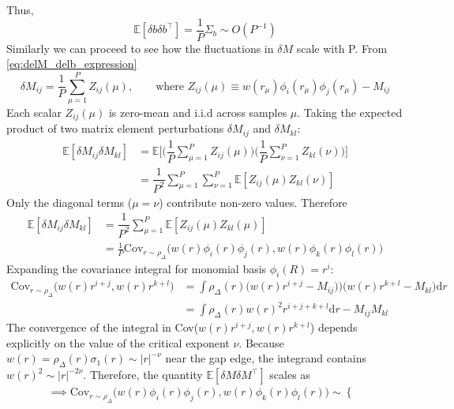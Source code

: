 \documentclass[11pt,a4paper]{article}
\theoremstyle{remark}
\newcommand{\E}{\mathbb{E}}
\newcommand{\rmd}{\textrm{d}}
\newcommand{\del}{\delta}
\begin{document}
\begin{onehalfspace}
\begin{equation}
\end{equation}
Thus, 
\begin{equation}\label{eq:del_b_fluctuation}
    \E[\del b\del b ^{\top}]= \frac{1}{P}\Sigma_b \sim O(P^{-1})
\end{equation}
Similarly we can proceed to see how the fluctuations in $\del M$ scale with P. From \eqref{eq:delM_delb_expression}
\begin{equation}
    \del M_{ij} = \frac{1}{P}\sum_{\mu=1}^{P}Z_{ij}(\mu),\qquad \text{where }Z_{ij}(\mu)\equiv w(r_\mu)\phi_i(r_\mu)\phi_j(r_\mu) - M_{ij}
\end{equation}
Each scalar $Z_{ij}(\mu)$ is zero-mean and i.i.d across samples $\mu$. Taking the expected product of two matrix element perturbations $\del M_{ij}$ and $\del M_{kl}$:
\begin{align}
    \E[\del M_{ij}\del M_{kl}] &= \E\Bigg[ \Bigg( \dfrac{1}{P}\sum_{\mu=1}^{P}Z_{ij}(\mu)\Bigg)\Bigg( \dfrac{1}{P}\sum_{\nu=1}^{P}Z_{kl}(\nu)\Bigg)\Bigg]\nonumber \\
                              &= \dfrac{1}{P^2}\sum_{\mu=1}^{P}\sum_{\nu=1}^{P}\E[Z_{ij}(\mu)Z_{kl}(\nu)]
\end{align}
Only the diagonal terms ($\mu=\nu$) contribute non-zero values. Therefore
\begin{align}
    \E[\del M_{ij}\del M_{kl}] &= \dfrac{1}{P^2}\sum_{\mu=1}^{P}\E[Z_{ij}(\mu)Z_{kl}(\mu)]\nonumber \\
    &= \frac{1}{P}\text{Cov}_{r\sim\rho_\Delta}\big( w(r)\phi_i(r)\phi_j(r), w(r)\phi_k(r)\phi_l(r)\big)
\end{align}
Expanding the covariance integral for monomial basis $\phi_i(R) = r^{i}$:
\begin{align}
    \text{Cov}_{r\sim\rho_\Delta}\big( w(r)r^{i+j}, w(r)r^{k+l}\big) &= \int \rho_\Delta(r)\big(w(r)r^{i+j} - M_{ij}) \big)\big( w(r)r^{k+l} - M_{kl}\big)\rmd r \nonumber \\
                     &= \int \rho_\Delta(r)w(r)^2r^{i+j+k+l}\rmd r- M_{ij}M_{kl}
 \end{align}
The convergence of the integral in Cov($w(r)r^{i+j},w(r)r^{k+l}$) depends explicitly on the value of the critical exponent $\nu$. Because $w(r) = \rho_\Delta(r)\sigma_1(r)\sim|r|^{-\nu}$ near the gap edge, the integrand contains $w(r)^2\sim |r|^{-2\nu}$.
Therefore, the quantity $\E[\del M\del M^{\top}]$ scales as
 \begin{align}
 \implies \text{Cov}_{r\sim\rho_\Delta}\big( w(r)\phi_i(r)\phi_j(r), w(r)\phi_k(r)\phi_l(r)\big)\sim 
 \begin{cases}

\end{cases}
\end{align}
\end{onehalfspace}
\end{document}
